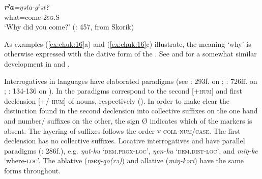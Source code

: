     \ex
    \glt \textbf{\textit{rˀa}}\textit{=ŋəta-gˀət?}\\
    what=come-2\textsc{sg}.S\\
    \glt ‘Why did you come?’ (\citealt{Spencer1995}: 457, from Skorik)
    \z
    \z

\noindent As examples (\ref{ex:chuk:16}a) and (\ref{ex:chuk:16}c) illustrate, the meaning ‘why’ is otherwise expressed with the dative form of the . See  and  for a somewhat similar development in  and .

Interrogatives in  languages have elaborated paradigms (see \citealt{Nagayama2011}: 293f. on ; \citealt{Bogoras1922}: 726ff. on ; \citealt{GeorgVolodin1999}: 134-136 on ). In  the paradigms correspond to the second [+\textsc{hum}] and first declension [+/-\textsc{hum}] of nouns, respectively (). In order to make clear the distinction found in the second declension into collective suffixes on the one hand and number/ suffixes on the other, the sign Ø indicates which of the markers is absent. The layering of suffixes follows the order \textsc{v-coll-num/case}. The first declension has no collective suffixes. Locative interrogatives and  have parallel paradigms (\citealt{Dunn1999}: 286f.), e.g. \textit{ŋut-ku} ‘\textsc{dem.prox}-\textsc{loc}’, \textit{ŋen-ku} ‘\textsc{dem.dist}-\textsc{loc}’, and \textit{miŋ-ke} ‘where-\textsc{loc}’. The ablative (\textit{m}\textbf{\textit{e}}\textit{ŋ-qo(rə)}) and allative (\textit{miŋ-kəri}) have the same forms throughout.

